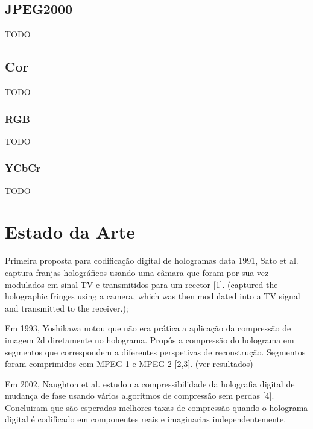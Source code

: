 \subsection{JPEG2000}
\label{ssec::estado-arte:jpeg2000}

TODO


\subsection{Cor}
\label{ssec::estado-arte:cor}

TODO

\subsubsection{\ac{RGB}}
\label{sssec::estado-arte:cor:rgb}

TODO

\subsubsection{YCbCr}
\label{sssec::estado-arte:cor:ycbcr}

TODO


\section{Estado da Arte}
\label{sec::estado-arte:estado-arte}


Primeira proposta para codificação digital de hologramas data 1991, Sato et al. captura franjas holográficos usando uma câmara que foram por sua vez modulados em sinal TV e transmitidos para um recetor [1]. (captured the holographic fringes using a camera, which was then modulated into a TV signal and transmitted to the receiver.);
  
Em 1993, Yoshikawa notou que não era prática a aplicação da compressão de imagem 2d diretamente no holograma. Propôs a compressão do holograma em segmentos que correspondem a diferentes perspetivas de reconstrução. Segmentos foram comprimidos com MPEG-1 e MPEG-2 [2,3]. (ver resultados)

Em 2002, Naughton et al. estudou a compressibilidade da holografia digital de mudança de fase usando vários algoritmos de compressão sem perdas [4]. Concluiram que são esperadas melhores taxas de compressão quando o holograma digital é codificado em componentes reais e imaginarias independentemente.

